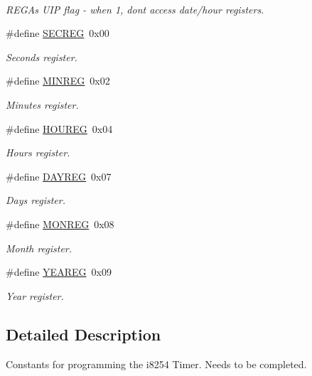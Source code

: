\begin{DoxyCompactItemize}
$$\begin{DoxyCompactList}\small\item\em R\+E\+GA\textquotesingle{}s U\+IP flag -\/ when 1, don\textquotesingle{}t access date/hour registers. \end{DoxyCompactList}\item 
\hypertarget{group__rtcmacro_ga69918592b9e0cc1c96c43c306d0ace10}{}\label{group__rtcmacro_ga69918592b9e0cc1c96c43c306d0ace10} 
\#define \hyperlink{group__rtcmacro_ga69918592b9e0cc1c96c43c306d0ace10}{S\+E\+C\+R\+EG}~0x00
\begin{DoxyCompactList}\small\item\em Seconds register. \end{DoxyCompactList}\item 
\hypertarget{group__rtcmacro_gafbf6f6120989061bb2d82f7936aa1e73}{}\label{group__rtcmacro_gafbf6f6120989061bb2d82f7936aa1e73} 
\#define \hyperlink{group__rtcmacro_gafbf6f6120989061bb2d82f7936aa1e73}{M\+I\+N\+R\+EG}~0x02
\begin{DoxyCompactList}\small\item\em Minutes register. \end{DoxyCompactList}\item 
\hypertarget{group__rtcmacro_gaed693ead5cc7da76b4e94a4aefa0b30b}{}\label{group__rtcmacro_gaed693ead5cc7da76b4e94a4aefa0b30b} 
\#define \hyperlink{group__rtcmacro_gaed693ead5cc7da76b4e94a4aefa0b30b}{H\+O\+U\+R\+EG}~0x04
\begin{DoxyCompactList}\small\item\em Hours register. \end{DoxyCompactList}\item 
\hypertarget{group__rtcmacro_gad33a6b23dcdd06003d2915940dc7b7ed}{}\label{group__rtcmacro_gad33a6b23dcdd06003d2915940dc7b7ed} 
\#define \hyperlink{group__rtcmacro_gad33a6b23dcdd06003d2915940dc7b7ed}{D\+A\+Y\+R\+EG}~0x07
\begin{DoxyCompactList}\small\item\em Days register. \end{DoxyCompactList}\item 
\hypertarget{group__rtcmacro_gaacd85e8a61912491f7dd3076b5e80e71}{}\label{group__rtcmacro_gaacd85e8a61912491f7dd3076b5e80e71} 
\#define \hyperlink{group__rtcmacro_gaacd85e8a61912491f7dd3076b5e80e71}{M\+O\+N\+R\+EG}~0x08
\begin{DoxyCompactList}\small\item\em Month register. \end{DoxyCompactList}\item 
\hypertarget{group__rtcmacro_gab6a23fdf0355f6d0fa7118ef326a7053}{}\label{group__rtcmacro_gab6a23fdf0355f6d0fa7118ef326a7053} 
\#define \hyperlink{group__rtcmacro_gab6a23fdf0355f6d0fa7118ef326a7053}{Y\+E\+A\+R\+EG}~0x09
\begin{DoxyCompactList}\small\item\em Year register. \end{DoxyCompactList}\end{DoxyCompactItemize}


\subsection{Detailed Description}
Constants for programming the i8254 Timer. Needs to be completed. 

